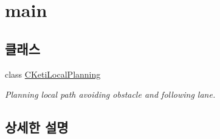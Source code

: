 \hypertarget{group___main_group}{}\section{main}
\label{group___main_group}
\subsection*{클래스}
\begin{DoxyCompactItemize}
\item 
class \hyperlink{class_c_keti_local_planning}{C\+Keti\+Local\+Planning}
\begin{DoxyCompactList}\small\item\em Planning local path avoiding obstacle and following lane. \end{DoxyCompactList}\end{DoxyCompactItemize}


\subsection{상세한 설명}
